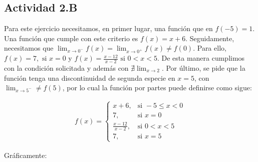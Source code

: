 \subsection*{Actividad 2.B}

Para este ejercicio necesitamos, en primer lugar, una función que en $f(-5) = 1$. Una función que cumple con este criterio es $f(x) = x + 6$.
Seguidamente, necesitamos que $\lim_{x \to 0^-}f(x) = \lim_{x \to 0^+}f(x) \neq f(0)$. Para ello, $f(x) = 7, \text{ si } x = 0$ 
y $f(x) = \frac{x - 12}{x - 2} \text{ si } 0 < x < 5$. De esta manera cumplimos con la condición solicitada y además con $\nexists \lim_{x \to 2}$. 
Por último, se pide que la función tenga una discontinuidad de segunda especie en $x = 5$, con $\lim_{x \to 5^-} \neq f(5)$, por lo cual la función por partes
puede definirse como sigue:

\begin{align*}
    f(x) = 
    \begin{cases}
        x + 6,              & \text{si } -5 \leq x < 0\\
        7,                  & \text{si } x = 0\\
        \frac{x-12}{x-2},   & \text{si } 0 < x < 5\\
        7,                  & \text{si } x = 5
    \end{cases}
\end{align*}

Gráficamente:

\begin{center}
    \end{center}
    